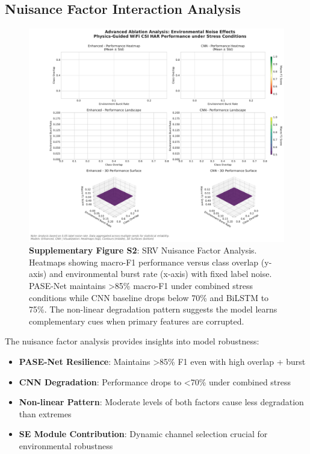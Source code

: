 \documentclass[10pt,a4paper]{article}
\begin{document}
\subsection{Nuisance Factor Interaction Analysis}

\begin{figure}[h!]
\centering
\includegraphics[width=\textwidth]{plots/ablation_noise_env_claude4.pdf}
\caption{\textbf{Supplementary Figure S2}: SRV Nuisance Factor Analysis. Heatmaps showing macro-F1 performance versus class overlap (y-axis) and environmental burst rate (x-axis) with fixed label noise. PASE-Net maintains >85\% macro-F1 under combined stress conditions while CNN baseline drops below 70\% and BiLSTM to 75\%. The non-linear degradation pattern suggests the model learns complementary cues when primary features are corrupted.}
\label{fig:supp_nuisance_factors}
\end{figure}

The nuisance factor analysis provides insights into model robustness:

\begin{itemize}
\item \textbf{PASE-Net Resilience}: Maintains >85\% F1 even with high overlap + burst
\item \textbf{CNN Degradation}: Performance drops to <70\% under combined stress
\item \textbf{Non-linear Pattern}: Moderate levels of both factors cause less degradation than extremes
\item \textbf{SE Module Contribution}: Dynamic channel selection crucial for environmental robustness
\end{itemize}
\end{document}
